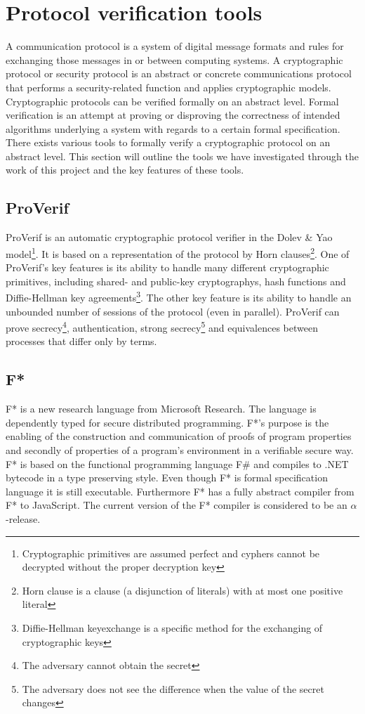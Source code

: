 \documentclass[twosided]{report}
\begin{document}
\section{Protocol verification tools}
A communication protocol is a system of digital message formats and rules for exchanging those messages in or between computing systems. A cryptographic protocol or security protocol is an abstract or concrete communications protocol that performs a security-related function and applies cryptographic models. Cryptographic protocols can be verified formally on an abstract level. Formal verification is an attempt at proving or disproving the correctness of intended algorithms underlying a system with regards to a certain formal specification. There exists various tools to formally verify a cryptographic protocol on an abstract level. This section will outline the tools we have investigated through the work of this project and the key features of these tools.

\subsection{ProVerif}
ProVerif is an automatic cryptographic protocol verifier in the Dolev \& Yao model\footnote{Cryptographic primitives are assumed perfect and cyphers cannot be decrypted without the proper decryption key}. It is based on a representation of the protocol by Horn clauses\footnote{Horn clause is a clause (a disjunction of literals) with at most one positive literal}. One of ProVerif's key features is its ability to handle many different cryptographic primitives, including shared- and public-key cryptographys, hash functions and Diffie-Hellman key agreements\footnote{Diffie-Hellman keyexchange is a specific method for the exchanging of cryptographic keys}. The other key feature is its ability to handle an unbounded number of sessions of the protocol (even in parallel). ProVerif can prove secrecy\footnote{The adversary cannot obtain the secret}, authentication, strong secrecy\footnote{The adversary does not see the difference when the value of the secret changes} and equivalences between processes that differ only by terms.

\subsection{F*}
\label{sect:techbgfstar}
F* is a new research language from Microsoft Research. The language is dependently typed for secure distributed programming. F*'s purpose is the enabling of the construction and communication of proofs of program properties and secondly of properties of a program's environment in a verifiable secure way. F* is based on the functional programming language F\# and compiles to .NET bytecode in a type preserving style. Even though F* is formal specification language it is still executable. Furthermore F* has a fully abstract compiler from F* to JavaScript. The current version of the F* compiler is considered to be an $\alpha$-release.
\end{document}

